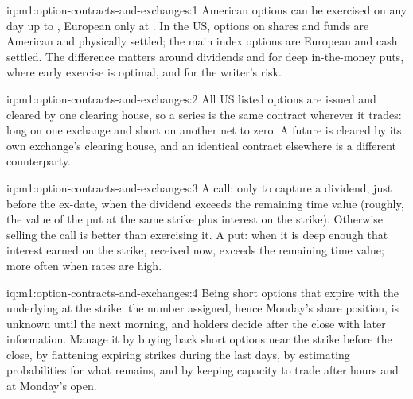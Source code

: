 \begin{solution}{iq:m1:option-contracts-and-exchanges:1}
American options can be exercised on any day up to , European only at
. In the US, options on shares and funds are American and physically
settled; the main index options are European and cash settled. The
difference matters around dividends and for deep in-the-money puts, where
early exercise is optimal, and for the writer's  risk.
\end{solution}

\begin{solution}{iq:m1:option-contracts-and-exchanges:2}
All US listed options are issued and cleared by one clearing house, so a
series is the same contract wherever it trades: long on one exchange and
short on another net to zero. A future is cleared by its own exchange's
clearing house, and an identical contract elsewhere is a different
counterparty.
\end{solution}

\begin{solution}{iq:m1:option-contracts-and-exchanges:3}
A call: only to capture a dividend, just before the ex-date, when the
dividend exceeds the remaining time value (roughly, the value of the put at
the same strike plus interest on the strike). Otherwise selling the call is
better than exercising it. A put: when it is deep enough  that
interest earned on the strike, received now, exceeds the remaining time
value; more often when rates are high.
\end{solution}

\begin{solution}{iq:m1:option-contracts-and-exchanges:4}
Being short options that expire with the underlying at the strike: the
number assigned, hence Monday's share position, is unknown until the next
morning, and holders decide after the close with later information. Manage
it by buying back short options near the strike before the close, by
flattening expiring strikes during the last days, by estimating 
probabilities for what remains, and by keeping capacity to trade after hours
and at Monday's open.
\end{solution}

